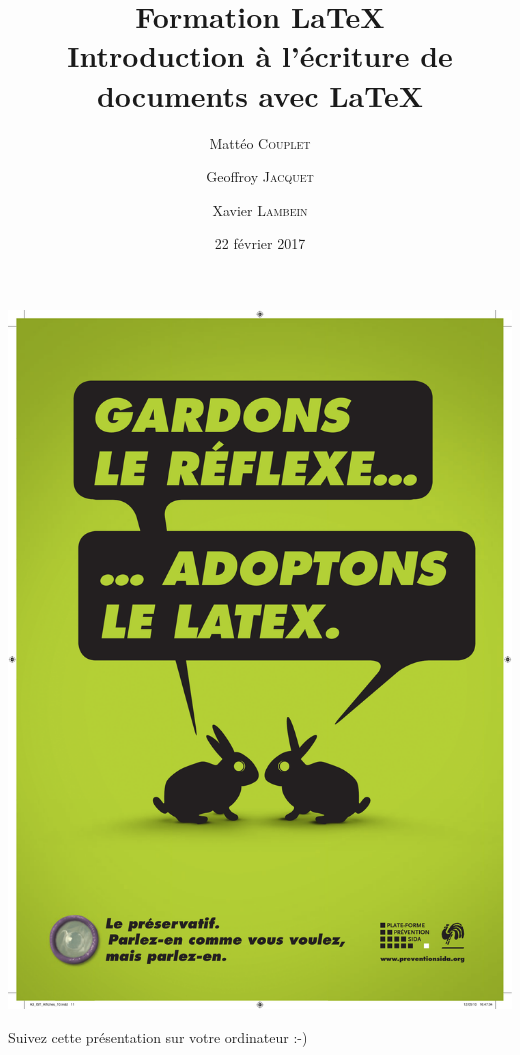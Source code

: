 \documentclass[10pt,svgnames,usenames,table]{beamer} %
\institute{Louvain-li-Nux}
\title{\textbf{Formation \LaTeX}\\
Introduction à l'écriture de documents avec \LaTeX}
\author{Mattéo \textsc{Couplet} \and Geoffroy \textsc{Jacquet} \and Xavier \textsc{Lambein}}
\date{22 février 2017}
\begin{document}
\begin{landscape}
  \begin{frame}
    \vspace{-.5cm}
    \hspace*{.1mm}
    \includegraphics[page=1,height=\paperwidth]{latex_sida.pdf}
  \end{frame}
\end{landscape}

\begin{frame}
  \begin{center}\Large
  Suivez cette présentation sur votre ordinateur :-)
  
  \vspace{1cm}
  \end{center}
\end{frame}
\end{document}
